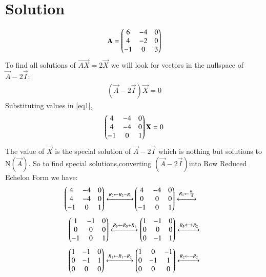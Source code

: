 \documentclass[journal,12pt,twocolumn]{IEEEtran}
\begin{document}
\section{Solution}
\begin{flushleft}
\begin{align}
\mathbf{A}=
\begin{pmatrix}6 & -4 & 0\\
4& -2 & 0\\
-1 &0 &3\end{pmatrix}
\end{align}
To find all solutions of $\vec{AX}=2\vec{X}$ we will look for vectors in the nullspace of $\vec{A}-2\vec{I}$:
\begin{align}\label{eq1}
(\vec{A}-2\vec{I})\vec{X}=0
\end{align}
Substituting values in \eqref{eq1},
\begin{align}
\begin{pmatrix}4 & -4 & 0\\
4 & -4 & 0\\
-1 &0 &1\end{pmatrix}
\mathbf{X}=0
\end{align}
The value of $\vec{X}$ is the special solution of $\vec{A}-2\vec{I}$ which is nothing but solutions to N$(\vec{A})$.
So to find special solutions,converting $(\vec A-2\vec I)$into
Row Reduced Echelon Form we have:
\begin{align}
\begin{pmatrix}4& -4&0\\
4 & -4 & 0\\
-1 & 0 &1
\end{pmatrix}
\xleftrightarrow[]{R_2 \leftarrow R_2- R_1 } 
&
\begin{pmatrix}4&-4&0\\
0&0&0\\
-1&0&1\end{pmatrix}
\xleftrightarrow[]{R_1 \leftarrow \frac{R_1}{4} } \nonumber 
\end{align}
\begin{align}
    \begin{pmatrix}1&-1&0\\
            0&0&0\\
            -1&0&1\end{pmatrix}
    \xleftrightarrow[]{R_3 \leftarrow R_3+R_1 }
    \begin{pmatrix}1&-1&0\\
            0&0&0\\
            0&-1&1\end{pmatrix}
    \xleftrightarrow[]{R_3 \xleftrightarrow[]{} R_2 } \nonumber
\end{align}
\begin{align}
    \begin{pmatrix}1&-1&0\\
    0&-1&1\\
    0&0&0\end{pmatrix}
    \xleftrightarrow[]{R_1 \leftarrow R_1-R_2} 
    \begin{pmatrix}1&0&-1\\
    0&-1&1\\
    0&0&0\end{pmatrix}   
    \xleftrightarrow[]{R_2 \leftarrow -R_2} \nonumber
\end{align}

\end{flushleft}
\end{document}
